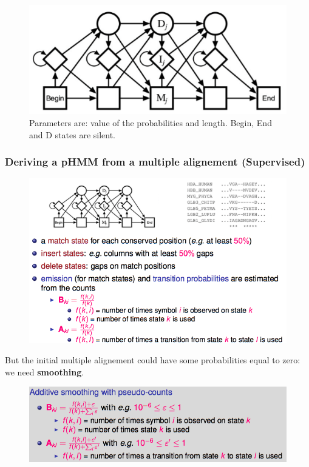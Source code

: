 \begin{figure}[H]
	\centering
	\includegraphics[scale=0.6]{images/41_phmm.png}
	\caption{Parameters are: value of the probabilities and length. Begin, End and D states are silent.}
\end{figure}

\subsubsection{Deriving a pHMM from a multiple alignement (Supervised)}


\begin{figure}[H]
	\centering
	\includegraphics[scale=0.5]{images/42_deriving.png}
\end{figure}

But the initial multiple alignement could have some probabilities equal to zero: we need \textbf{smoothing}.

\begin{figure}[htp]
	\centering
	\includegraphics[scale=0.5]{images/43_smoothing.png}
\end{figure}

